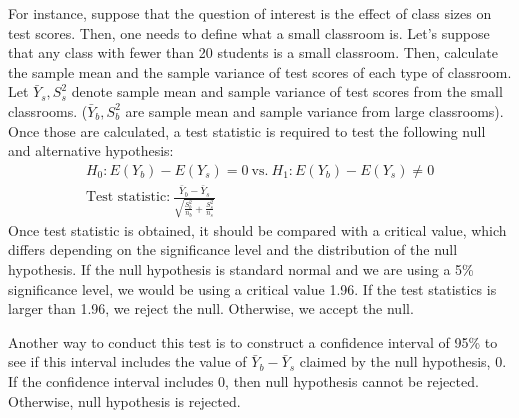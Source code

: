 For instance, suppose that the question of interest is the effect of class sizes on test scores. Then, one needs to define what a small classroom is. Let's suppose that any class with fewer than 20 students is a small classroom. Then, calculate the sample mean and the sample variance of test scores of each type of classroom. Let $\bar{Y}_s,S^2_s$ denote sample mean and sample variance of test scores from the small classrooms. ($\bar{Y}_b, S^2_b$ are sample mean and sample variance from large classrooms). Once those are calculated, a test statistic is required to test the following null and alternative hypothesis:
\begin{gather*}
H_0: E(Y_b)-E(Y_s) = 0\ \text{vs.}\ H_1:E(Y_b)-E(Y_s) \neq 0\\
\text{Test statistic:} \ \frac{\bar{Y}_b-\bar{Y}_s}{\sqrt{\frac{S_b^2}{n_b}+\frac{S_s^2}{n_s}}}
\end{gather*}
Once test statistic is obtained, it should be compared with a critical value, which differs depending on the significance level and the distribution of the null hypothesis. If the null hypothesis is standard normal and we are using a 5\% significance level, we would be using a critical value 1.96. If the test statistics is larger than 1.96, we reject the null. Otherwise, we accept the null.
\par
 Another way to conduct this test is to construct a confidence interval of 95\% to see if this interval includes the value of 
$\bar{Y}_b-\bar{Y}_s$ claimed by the null hypothesis, 0. If the confidence interval includes 0, then null hypothesis cannot be rejected. Otherwise, null hypothesis is rejected.
\par\medskip

